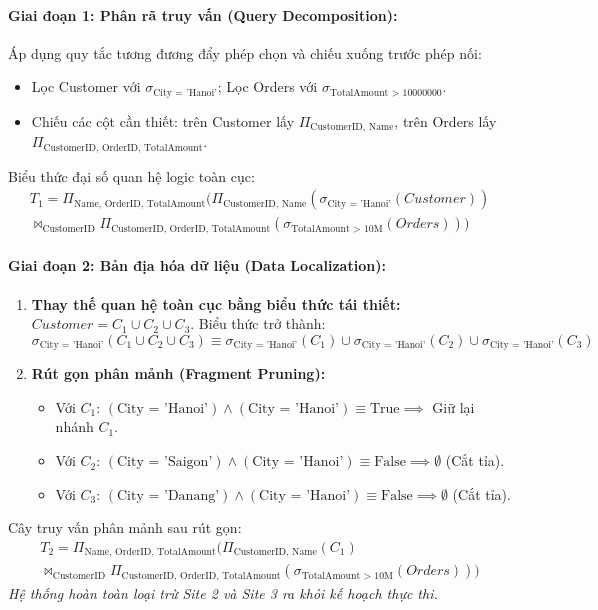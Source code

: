 \documentclass[12pt,a4paper]{report}
\begin{document}
\paragraph{Giai đoạn 1: Phân rã truy vấn (Query Decomposition):}
Áp dụng quy tắc tương đương đẩy phép chọn và chiếu xuống trước phép nối:
\begin{itemize}[leftmargin=0.8cm, topsep=1pt, itemsep=1pt]
    \item Lọc Customer với $\sigma_{\text{City = 'Hanoi'}}$; Lọc Orders với $\sigma_{\text{TotalAmount > 10000000}}$.
    \item Chiếu các cột cần thiết: trên Customer lấy $\Pi_{\text{CustomerID, Name}}$, trên Orders lấy $\Pi_{\text{CustomerID, OrderID, TotalAmount}}$.
\end{itemize}
Biểu thức đại số quan hệ logic toàn cục:
\begin{multline*}
T_1 = \Pi_{\text{Name, OrderID, TotalAmount}} \Big( \Pi_{\text{CustomerID, Name}}(\sigma_{\text{City = 'Hanoi'}}(Customer)) \\
\bowtie_{\text{CustomerID}} \Pi_{\text{CustomerID, OrderID, TotalAmount}}(\sigma_{\text{TotalAmount > 10M}}(Orders)) \Big)
\end{multline*}

\paragraph{Giai đoạn 2: Bản địa hóa dữ liệu (Data Localization):}
\begin{enumerate}[leftmargin=0.8cm, topsep=1pt, itemsep=1pt]
    \item \textbf{Thay thế quan hệ toàn cục bằng biểu thức tái thiết:} $Customer = C_1 \cup C_2 \cup C_3$. Biểu thức trở thành:
    \[\sigma_{\text{City = 'Hanoi'}}(C_1 \cup C_2 \cup C_3) \equiv \sigma_{\text{City = 'Hanoi'}}(C_1) \cup \sigma_{\text{City = 'Hanoi'}}(C_2) \cup \sigma_{\text{City = 'Hanoi'}}(C_3)\]
    \item \textbf{Rút gọn phân mảnh (Fragment Pruning):}
    \begin{itemize}
        \item Với $C_1$: $(\text{City = 'Hanoi'}) \wedge (\text{City = 'Hanoi'}) \equiv \text{True} \implies$ Giữ lại nhánh $C_1$.
        \item Với $C_2$: $(\text{City = 'Saigon'}) \wedge (\text{City = 'Hanoi'}) \equiv \text{False} \implies \emptyset$ (Cắt tỉa).
        \item Với $C_3$: $(\text{City = 'Danang'}) \wedge (\text{City = 'Hanoi'}) \equiv \text{False} \implies \emptyset$ (Cắt tỉa).
    \end{itemize}
\end{enumerate}
Cây truy vấn phân mảnh sau rút gọn:
\begin{multline*}
T_2 = \Pi_{\text{Name, OrderID, TotalAmount}} \Big( \Pi_{\text{CustomerID, Name}}(C_1) \\
\bowtie_{\text{CustomerID}} \Pi_{\text{CustomerID, OrderID, TotalAmount}}(\sigma_{\text{TotalAmount > 10M}}(Orders)) \Big)
\end{multline*}
\textit{Hệ thống hoàn toàn loại trừ Site 2 và Site 3 ra khỏi kế hoạch thực thi.}
\end{document}
